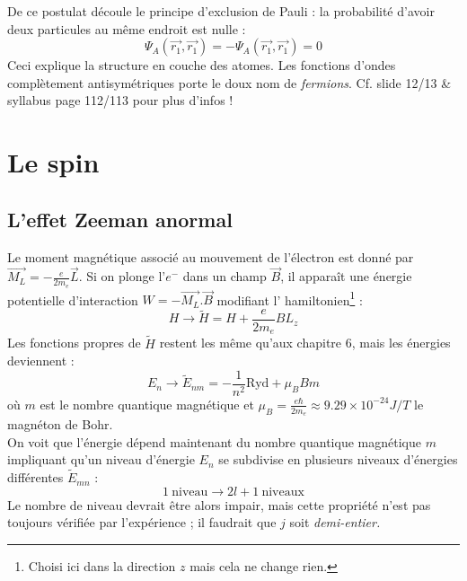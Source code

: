 \documentclass[british,french,11pt, a4paper, openany]{book}
\begin{document}
De ce postulat découle le principe d'exclusion de Pauli : la probabilité d'avoir deux particules au même endroit est nulle :
\begin{equation}
	\Psi_A(\vec{r_1},\vec{r_1}) = -\Psi_A(\vec{r_1},\vec{r_1}) = 0
\end{equation}
Ceci explique la structure en couche des atomes. Les fonctions d'ondes complètement antisymétriques porte le doux nom de \textit{fermions}. Cf. slide 12/13 \& syllabus page 112/113 pour plus d'infos !



\chapter{Le spin}
\section{L'effet Zeeman anormal}
Le moment magnétique associé au mouvement de l'électron est donné par $\vec{M_L} = 
-\frac{e}{2m_e}\vec{L}$. Si on plonge l'$e^-$ dans un champ $\vec{B}$, il apparaît
une énergie potentielle d'interaction $W = -\vec{M_L}.\vec{B}$ modifiant l'
hamiltonien\footnote{Choisi ici dans la direction $z$ mais cela ne change rien.} :
\begin{equation}
	H \rightarrow \tilde{H} = H + \frac{e}{2m_e}BL_z
\end{equation}
Les fonctions propres de $\tilde{H}$ restent les même qu'aux chapitre 6, mais les 
énergies deviennent :
\begin{equation}
	E_n \rightarrow \tilde{E}_{nm} = -\frac{1}{n^2}\text{Ryd} + \mu_BBm
\end{equation}
où $m$ est le nombre quantique magnétique et $\mu_B = \frac{e\hbar}{2m_e} \approx
9.29\times 10^{-24} J/T$ le magnéton de Bohr.\\
On voit que l'énergie dépend maintenant du nombre quantique magnétique $m$ impliquant
qu'un niveau d'énergie $E_n$ se subdivise en plusieurs niveaux d'énergies différentes
$\tilde{E}_{mn}$ :
\begin{equation}
	1\ \text{niveau} \rightarrow 2l + 1\ \text{niveaux}
\end{equation}
Le nombre de niveau devrait être alors impair, mais cette propriété n'est pas toujours
vérifiée par l'expérience ; il faudrait que $j$ soit \textit{demi-entier.}
\end{document}
